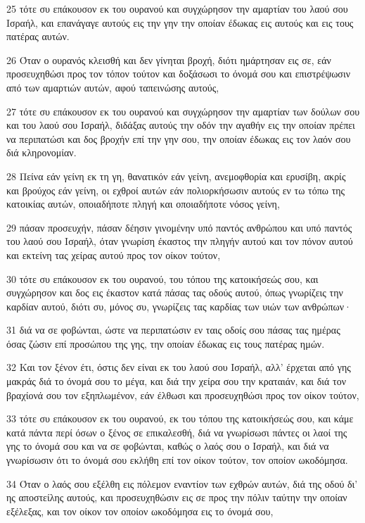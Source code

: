 \par 25 τότε συ επάκουσον εκ του ουρανού και συγχώρησον την αμαρτίαν του λαού σου Ισραήλ, και επανάγαγε αυτούς εις την γην την οποίαν έδωκας εις αυτούς και εις τους πατέρας αυτών.
\par 26 Όταν ο ουρανός κλεισθή και δεν γίνηται βροχή, διότι ημάρτησαν εις σε, εάν προσευχηθώσι προς τον τόπον τούτον και δοξάσωσι το όνομά σου και επιστρέψωσιν από των αμαρτιών αυτών, αφού ταπεινώσης αυτούς,
\par 27 τότε συ επάκουσον εκ του ουρανού και συγχώρησον την αμαρτίαν των δούλων σου και του λαού σου Ισραήλ, διδάξας αυτούς την οδόν την αγαθήν εις την οποίαν πρέπει να περιπατώσι και δος βροχήν επί την γην σου, την οποίαν έδωκας εις τον λαόν σου διά κληρονομίαν.
\par 28 Πείνα εάν γείνη εκ τη γη, θανατικόν εάν γείνη, ανεμοφθορία και ερυσίβη, ακρίς και βρούχος εάν γείνη, οι εχθροί αυτών εάν πολιορκήσωσιν αυτούς εν τω τόπω της κατοικίας αυτών, οποιαδήποτε πληγή και οποιαδήποτε νόσος γείνη,
\par 29 πάσαν προσευχήν, πάσαν δέησιν γινομένην υπό παντός ανθρώπου και υπό παντός του λαού σου Ισραήλ, όταν γνωρίση έκαστος την πληγήν αυτού και τον πόνον αυτού και εκτείνη τας χείρας αυτού προς τον οίκον τούτον,
\par 30 τότε συ επάκουσον εκ του ουρανού, του τόπου της κατοικήσεώς σου, και συγχώρησον και δος εις έκαστον κατά πάσας τας οδούς αυτού, όπως γνωρίζεις την καρδίαν αυτού, διότι συ, μόνος συ, γνωρίζεις τας καρδίας των υιών των ανθρώπων·
\par 31 διά να σε φοβώνται, ώστε να περιπατώσιν εν ταις οδοίς σου πάσας τας ημέρας όσας ζώσιν επί προσώπου της γης, την οποίαν έδωκας εις τους πατέρας ημών.
\par 32 Και τον ξένον έτι, όστις δεν είναι εκ του λαού σου Ισραήλ, αλλ' έρχεται από γης μακράς διά το όνομά σου το μέγα, και διά την χείρα σου την κραταιάν, και διά τον βραχίονά σου τον εξηπλωμένον, εάν έλθωσι και προσευχηθώσι προς τον οίκον τούτον,
\par 33 τότε συ επάκουσον εκ του ουρανού, εκ του τόπου της κατοικήσεώς σου, και κάμε κατά πάντα περί όσων ο ξένος σε επικαλεσθή, διά να γνωρίσωσι πάντες οι λαοί της γης το όνομά σου και να σε φοβώνται, καθώς ο λαός σου ο Ισραήλ, και διά να γνωρίσωσιν ότι το όνομά σου εκλήθη επί τον οίκον τούτον, τον οποίον ωκοδόμησα.
\par 34 Όταν ο λαός σου εξέλθη εις πόλεμον εναντίον των εχθρών αυτών, διά της οδού δι' ης αποστείλης αυτούς, και προσευχηθώσιν εις σε προς την πόλιν ταύτην την οποίαν εξέλεξας, και τον οίκον τον οποίον ωκοδόμησα εις το όνομά σου,
